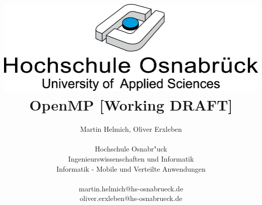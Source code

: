 \documentclass[11pt]{scrartcl}
\begin{document}
\author{ Martin Helmich, Oliver Erxleben \\ \\ Hochschule Osnabr"uck \\
Ingenieurswissenschaften und Informatik \\ Informatik - Mobile und Verteilte Anwendungen
\\ \\ martin.helmich@hs-osnabrueck.de \\ oliver.erxleben@hs-osnabrueck.de }

\title{\includegraphics[scale=0.75,keepaspectratio]{img/hs_os.png}\linebreak \linebreak
OpenMP [Working DRAFT]}

\maketitle
\thispagestyle{empty}
\tableofcontents

\pagebreak
\pagestyle{plain}
\setcounter{page}{1}
\end{document}

